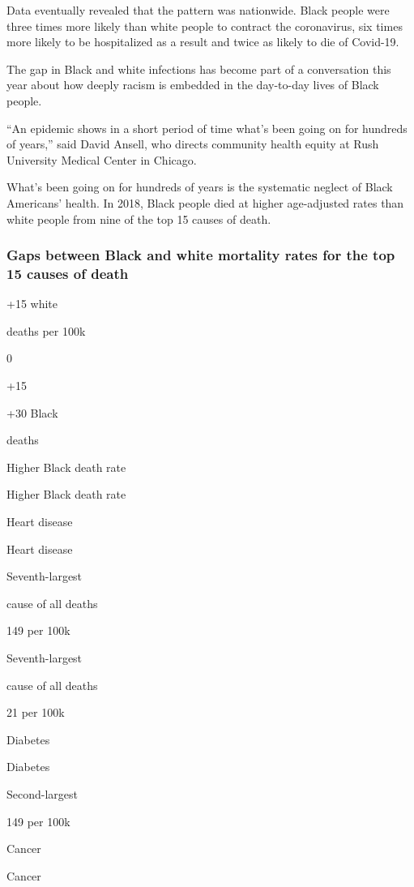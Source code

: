 Data eventually revealed that the pattern was nationwide. Black people
were three times more likely than white people to contract the
coronavirus, six times more likely to be hospitalized as a result and
twice as likely to die of Covid-19.

The gap in Black and white infections has become part of a conversation
this year about how deeply racism is embedded in the day-to-day lives of
Black people.

``An epidemic shows in a short period of time what's been going on for
hundreds of years,'' said David Ansell, who directs community health
equity at Rush University Medical Center in Chicago.

What's been going on for hundreds of years is the systematic neglect of
Black Americans' health. In 2018, Black people died at higher
age-adjusted rates than white people from nine of the top 15 causes of
death.

\hypertarget{gaps-between-black-and-white-mortality-rates-for-the-top-15-causes-of-death}{%
\subsubsection{Gaps between Black and white mortality rates for the top
15 causes of
death}\label{gaps-between-black-and-white-mortality-rates-for-the-top-15-causes-of-death}}

+15 white

deaths per 100k

0

+15

+30 Black

deaths

Higher Black death rate

Higher Black death rate

Heart disease

Heart disease

Seventh-largest

cause of all deaths

149 per 100k

Seventh-largest

cause of all deaths

21 per 100k

Diabetes

Diabetes

Second-largest

149 per 100k

Cancer

Cancer

